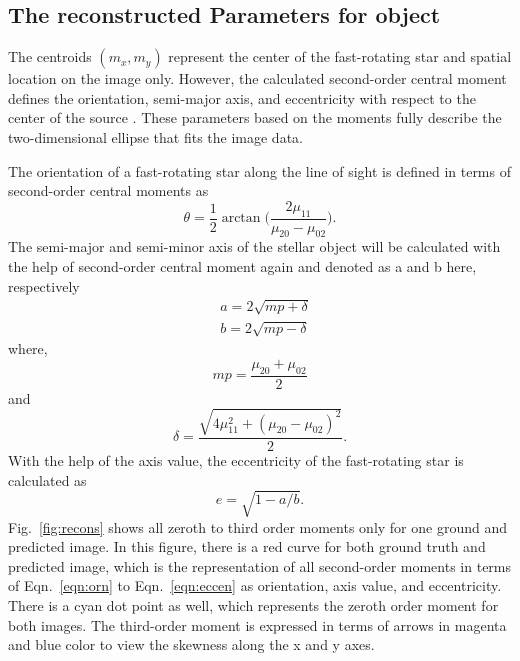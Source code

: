 \subsection{The reconstructed Parameters for object}
The centroids $(m_x, m_y)$ represent the center of the fast-rotating star and spatial location on the image only. However, the calculated second-order central moment defines the orientation, semi-major axis, and eccentricity with respect to the center of the source \citep{teague1980image}. These parameters based on the moments fully describe the two-dimensional ellipse that fits the image data. 

The orientation of a fast-rotating star along the line of sight is defined in terms of second-order central moments as
\begin{equation}
	\theta = \frac{1}{2}\arctan \big(\frac{2\mu_{11}}{\mu_{20} - \mu_{02}}\big).
	\label{eqn:orn}
\end{equation}
The semi-major and semi-minor axis of the stellar object will be calculated with the help of second-order central moment again and denoted as a and b here, respectively
\begin{equation}
	\begin{aligned}
		&a = 2\sqrt{mp + \delta} \\
		&b = 2\sqrt{mp - \delta}
	\end{aligned}
	\label{eqn:semi}
\end{equation}
where,
\begin{equation}
	mp = \frac{\mu_{20} + \mu_{02}}{2}
	\label{eqn:mp}
\end{equation}
and
\begin{equation}
	\delta = \frac{\sqrt{4\mu_{11}^2 + (\mu_{20} - \mu_{02})^2}}{2}.	
	\label{eqn:delta}
\end{equation}
With the help of the axis value, the eccentricity of the fast-rotating star is calculated as
\begin{equation}
	e = \sqrt{1 - a/b}.
	\label{eqn:eccen}
\end{equation}
Fig.~\ref{fig:recons} shows all zeroth to third order moments only for one ground and predicted image. In this figure, there is a red curve for both ground truth and predicted image, which is the representation of all second-order moments in terms of Eqn.~\ref{eqn:orn} to Eqn.~\ref{eqn:eccen} as orientation, axis value, and eccentricity. There is a cyan dot point as well, which represents the zeroth order moment for both images. The third-order moment is expressed in terms of arrows in magenta and blue color to view the skewness along the x and y axes.